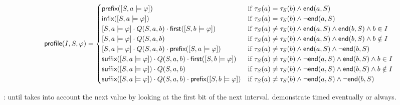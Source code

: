 \scriptsize
	\begin{equation*} 
		\mathsf{profile}(I, S, \varphi) =
		\begin{cases}
			\textsf{prefix}([S, a \models \varphi]) &\text{if $\tau_S(a) = \tau_S(b) \land \mathsf{end}(a, S)$} \\
			\textsf{infix}([S, a \models \varphi]) &\text{if $\tau_S(a) = \tau_S(b) \land \lnot\mathsf{end}(a, S)$} \\
			[S, a \models \varphi] \cdot Q(S, a, b) \cdot \textsf{first}([S, b \models \varphi]) &\text{if $\tau_S(a) \neq \tau_S(b) \land \mathsf{end}(a, S) \land \mathsf{end}(b, S) \land b \in I$} \\
			[S, a \models \varphi] \cdot Q(S, a, b) &\text{if $\tau_S(a) \neq \tau_S(b) \land \mathsf{end}(a, S) \land \mathsf{end}(b, S) \land b \notin I$} \\
			[S, a \models \varphi] \cdot Q(S, a, b) \cdot \textsf{prefix}([S, a \models \varphi]) &\text{if $\tau_S(a) \neq \tau_S(b) \land \mathsf{end}(a, S) \land \lnot\mathsf{end}(b, S)$} \\
			\textsf{suffix}([S, a \models \varphi]) \cdot Q(S, a, b) \cdot \textsf{first}([S, b \models \varphi]) &\text{if $\tau_S(a) \neq \tau_S(b) \land \lnot\mathsf{end}(a, S) \land \mathsf{end}(b, S) \land b \in I$} \\
			\textsf{suffix}([S, a \models \varphi]) \cdot Q(S, a, b) &\text{if $\tau_S(a) \neq \tau_S(b) \land \lnot\mathsf{end}(a, S) \land \mathsf{end}(b, S) \land b \notin I$} \\
			\textsf{suffix}([S, a \models \varphi]) \cdot Q(S, a, b) \cdot \textsf{prefix}([S, b \models \varphi]) &\text{if $\tau_S(a) \neq \tau_S(b) \land \lnot\mathsf{end}(a, S) \land \lnot\mathsf{end}(b, S)$} 
		\end{cases}
	\end{equation*}
\normalsize

\begin{example}
	\TODO: until takes into account the next value by looking at the first bit of the next interval. demonstrate timed eventually or always.
\end{example}